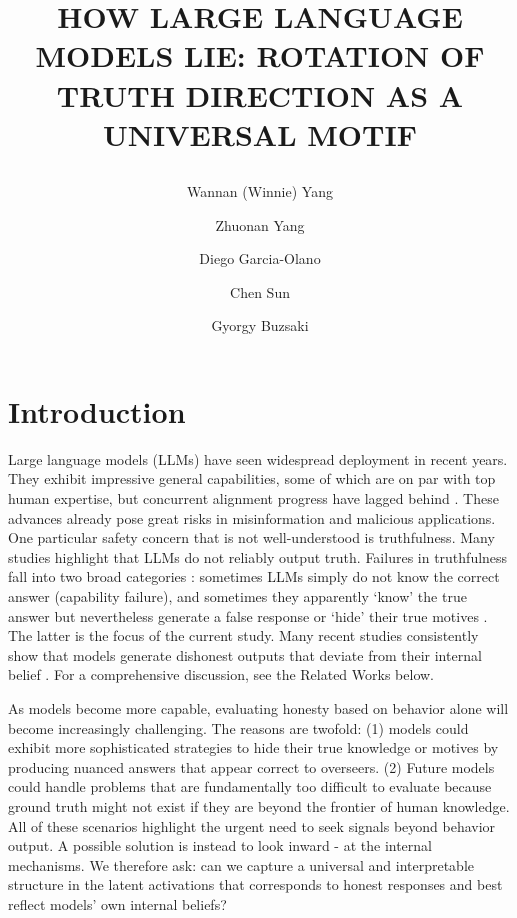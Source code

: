 \documentclass[]{paper}
\title{%
  \parbox[c]{0.95\linewidth}{
    \LARGE  %
    HOW LARGE LANGUAGE MODELS LIE: ROTATION OF TRUTH DIRECTION AS A UNIVERSAL MOTIF
    }%
}
\author[*, 1]{Wannan (Winnie) Yang}
\author[*, 2] {Zhuonan Yang}
\author[3] {Diego Garcia-Olano}
\author[4] {Chen Sun}
\author[1] {Gyorgy Buzsaki}
\affiliation[1]{New York University}
\affiliation[2]{Brown University}
\affiliation[3]{Meta Superintelligence Labs}
\affiliation[4]{Google DeepMind}
\begin{document}
\maketitle

\section{Introduction}

Large language models (LLMs) have seen widespread deployment in recent years. They exhibit impressive general capabilities, some of which are on par with top human expertise, but concurrent alignment progress have lagged behind \cite{bengio_safety, khan_debate, bowman_progress_oversight, burns_weak_strong}. These advances already pose great risks in misinformation and malicious applications. One particular safety concern that is not well-understood is truthfulness. Many studies highlight that LLMs do not reliably output truth. Failures in truthfulness fall into two broad categories \citep{evansTruthfulAIDeveloping2021}: sometimes LLMs simply do not know the correct answer (capability failure), and sometimes they apparently ‘know’ the true answer but nevertheless generate a false response or ‘hide’ their true motives \citep{perezDiscoveringLanguageModel2022, pacchiardiHowCatchAI2023, zouRepresentationEngineeringTopApproach2023, parkAIDeceptionSurvey2023}. The latter is the focus of the current study. Many recent studies consistently show that models generate dishonest outputs that deviate from their internal belief \citep{linTruthfulQAMeasuringHow2022, parkAIDeceptionSurvey2023, hubingerSleeperAgentsTraining2024, scheurerLARGELANGUAGEMODELS2024}. For a comprehensive discussion, see the Related Works below. 




As models become more capable, evaluating honesty based on behavior alone will become increasingly challenging. The reasons are twofold: (1) models could exhibit more sophisticated strategies to hide their true knowledge or motives by producing nuanced answers that appear correct to overseers. (2) Future models could handle problems that are fundamentally too difficult to evaluate because ground truth might not exist if they are beyond the frontier of human knowledge. All of these scenarios highlight the urgent need to seek signals beyond behavior output. A possible solution is instead to look inward - at the internal mechanisms. We therefore ask: can we capture a universal and interpretable structure in the latent activations that corresponds to honest responses and best reflect models’ own internal beliefs?
\end{document}
